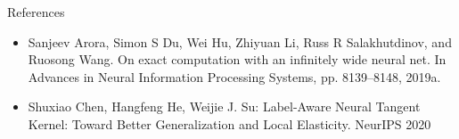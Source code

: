 \documentclass{beamer}
\begin{document}
	\begin{frame}{References}
		\begin{itemize}
			\item Sanjeev Arora, Simon S Du, Wei Hu, Zhiyuan Li, Russ R Salakhutdinov, and Ruosong Wang. On exact computation with an infinitely wide neural net. In Advances in Neural Information Processing Systems, pp. 8139–8148, 2019a.
			\item Shuxiao Chen, Hangfeng He, Weijie J. Su:
			Label-Aware Neural Tangent Kernel: Toward Better Generalization and Local Elasticity. NeurIPS 2020
		\end{itemize}
	\end{frame}
\end{document}
